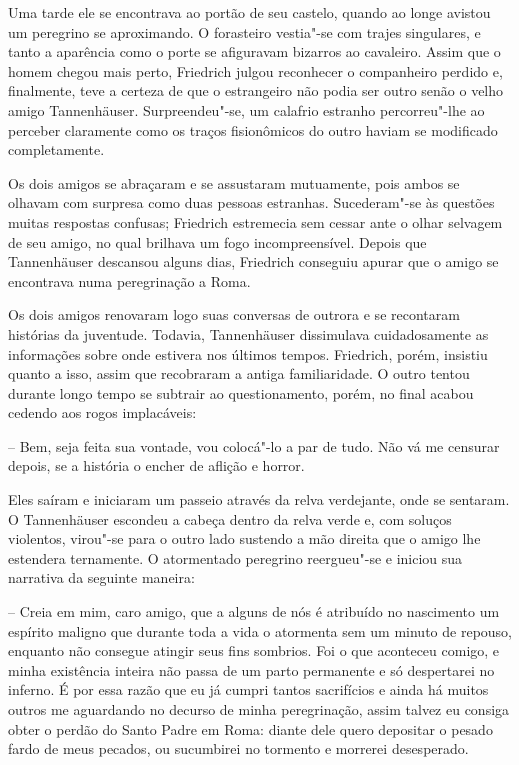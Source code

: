 Uma tarde ele se encontrava ao portão de seu castelo, quando ao longe
avistou um peregrino se aproximando. O forasteiro vestia"-se com
trajes singulares, e tanto a aparência como o porte se afiguravam
bizarros ao cavaleiro. Assim que o homem chegou mais perto, Friedrich
julgou reconhecer o companheiro perdido e, finalmente, teve a certeza
de que o estrangeiro não podia ser outro senão o velho amigo
Tannenhäuser. Surpreendeu"-se, um calafrio estranho percorreu"-lhe ao
perceber claramente como os traços fisionômicos do outro haviam se
modificado completamente.

Os dois amigos se abraçaram e se assustaram mutuamente, pois ambos se
olhavam com surpresa como duas pessoas estranhas. Sucederam"-se às
questões muitas respostas confusas; Friedrich estremecia sem cessar
ante o olhar selvagem de seu amigo, no qual brilhava um fogo
incompreensível. Depois que Tannenhäuser descansou alguns dias,
Friedrich conseguiu apurar que o amigo se encontrava numa peregrinação a Roma.

Os dois amigos renovaram logo suas conversas de outrora e se recontaram
histórias da juventude. Todavia, Tannenhäuser dissimulava 
cuidadosamente as \mbox{informações} sobre onde estivera nos últimos tempos.
Friedrich, porém, insistiu quanto a isso, assim que recobraram a antiga
familiaridade. O outro tentou durante longo tempo se subtrair ao
questionamento, porém, no final acabou cedendo aos rogos implacáveis:

-- Bem, seja feita sua vontade, vou colocá"-lo a par de tudo. Não vá
me censurar depois, se a história o encher de aflição e horror.

Eles saíram e iniciaram um passeio através da relva verdejante, onde se
sentaram. O Tannenhäuser escondeu a cabeça dentro da relva verde e, com
soluços violentos, virou"-se para o outro lado sustendo a mão direita
que o amigo lhe estendera ternamente. O atormentado peregrino
reergueu"-se e iniciou sua narrativa da seguinte maneira:

-- Creia em mim, caro amigo, que a alguns de nós é atribuído no
nascimento um espírito maligno que durante toda a vida o atormenta sem
um minuto de repouso, enquanto não consegue atingir seus fins sombrios.
Foi o que aconteceu comigo, e minha existência inteira não passa de um
parto permanente e só despertarei no inferno. É por essa razão que eu
já cumpri tantos sacrifícios e ainda há muitos outros me aguardando no
decurso de minha peregrinação, assim talvez eu consiga obter o perdão
do Santo Padre em Roma: diante dele quero depositar o pesado fardo de
meus pecados, ou sucumbirei no tormento e morrerei desesperado.


